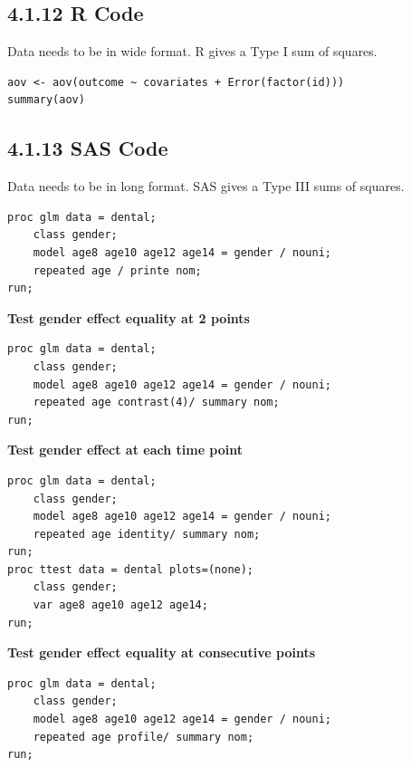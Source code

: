 \documentclass[11pt]{article}
\begin{document}
\subsection*{4.1.12 R Code}

Data needs to be in wide format. R gives a Type I sum of squares.

\begin{lstlisting}[style=Rstyle]
aov <- aov(outcome ~ covariates + Error(factor(id)))
summary(aov)
\end{lstlisting}

\subsection*{4.1.13 SAS Code}

Data needs to be in long format. SAS gives a Type III sums of squares.

\begin{lstlisting}[style=SASstyle]
proc glm data = dental;
    class gender;
    model age8 age10 age12 age14 = gender / nouni;
    repeated age / printe nom;
run;
\end{lstlisting}


\textbf{Test gender effect equality at 2 points}
\begin{lstlisting}[style=SASstyle]
proc glm data = dental;
    class gender;
    model age8 age10 age12 age14 = gender / nouni;
    repeated age contrast(4)/ summary nom;
run;
\end{lstlisting}

\textbf{Test gender effect at each time point}
\begin{lstlisting}[style=SASstyle]
proc glm data = dental;
    class gender;
    model age8 age10 age12 age14 = gender / nouni;
    repeated age identity/ summary nom;
run;
proc ttest data = dental plots=(none);
    class gender;
    var age8 age10 age12 age14;
run;
\end{lstlisting}

\textbf{Test gender effect equality at consecutive points}
\begin{lstlisting}[style=SASstyle]
proc glm data = dental;
    class gender;
    model age8 age10 age12 age14 = gender / nouni;
    repeated age profile/ summary nom;
run;
\end{lstlisting}


\newpage

\begin{tcolorbox}[modelbox, title={Model 2: MANOVA}]
\end{tcolorbox}
\end{document}

